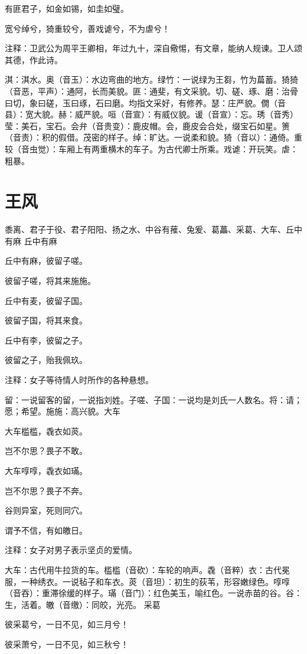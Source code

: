 \documentclass[12pt,UTF8]{ctexbook}
\begin{document}
有匪君子，如金如锡，如圭如璧。

宽兮绰兮，猗重较兮，善戏谑兮，不为虐兮！

注释：卫武公为周平王卿相，年过九十，深自儆惕，有文章，能纳人规谏。卫人颂其德，作此诗。

淇：淇水。奥（音玉）：水边弯曲的地方。绿竹：一说绿为王芻，竹为萹蓄。猗猗（音恶，平声）：通阿，长而美貌。匪：通斐，有文采貌。切、磋、琢、磨：治骨曰切，象曰磋，玉曰琢，石曰磨。均指文采好，有修养。瑟：庄严貌。僩（音县）：宽大貌。赫：威严貌。咺（音宣）：有威仪貌。谖（音宣）：忘。琇（音秀）莹：美石，宝石。会弁（音贵变）：鹿皮帽。会，鹿皮会合处，缀宝石如星。箦（音责）：积的假借。茂密的样子。绰：旷达。一说柔和貌。猗（音以）：通倚。重较（音虫觉）：车厢上有两重横木的车子。为古代卿士所乘。戏谑：开玩笑。虐：粗暴。



\part{王风}
黍离、君子于役、君子阳阳、扬之水、中谷有蓷、兔爰、葛藟、采葛、大车、丘中有麻
丘中有麻

丘中有麻，彼留子嗟。

彼留子嗟，将其来施施。

丘中有麦，彼留子国。

彼留子国，将其来食。

丘中有李，彼留之子。

彼留之子，贻我佩玖。

注释：女子等待情人时所作的各种悬想。

留：一说留客的留，一说指刘姓。子嗟、子国：一说均是刘氏一人数名。将：请；愿；希望。施施：高兴貌。大车

大车槛槛，毳衣如菼。

岂不尔思？畏子不敢。

大车啍啍，毳衣如璊。

岂不尔思？畏子不奔。

谷则异室，死则同穴。

谓予不信，有如皦日。

注释：女子对男子表示坚贞的爱情。

大车：古代用牛拉货的车。槛槛（音砍）：车轮的响声。毳（音粹）衣：古代冕服，一种绣衣。一说毡子和车衣。菼（音坦）：初生的荻苇，形容嫩绿色。啍啍（音吞）：重滞徐缓的样子。璊（音门）：红色美玉，喻红色。一说赤苗的谷。谷：生，活着。皦（音缴）：同皎，光亮。 采葛

彼采葛兮，一日不见，如三月兮！

彼采萧兮，一日不见，如三秋兮！
\end{document}

